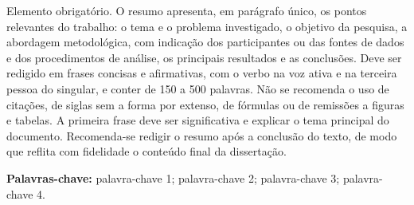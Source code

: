 \noindent
Elemento obrigatório. O resumo apresenta, em parágrafo único, os pontos relevantes do trabalho: o tema e o problema investigado, o objetivo da pesquisa, a abordagem metodológica, com indicação dos participantes ou das fontes de dados e dos procedimentos de análise, os principais resultados e as conclusões. Deve ser redigido em frases concisas e afirmativas, com o verbo na voz ativa e na terceira pessoa do singular, e conter de 150 a 500 palavras. Não se recomenda o uso de citações, de siglas sem a forma por extenso, de fórmulas ou de remissões a figuras e tabelas. A primeira frase deve ser significativa e explicar o tema principal do documento. Recomenda-se redigir o resumo após a conclusão do texto, de modo que reflita com fidelidade o conteúdo final da dissertação.

\par\bigskip
\noindent\textbf{Palavras-chave:} palavra-chave 1; palavra-chave 2; palavra-chave 3; palavra-chave 4.
